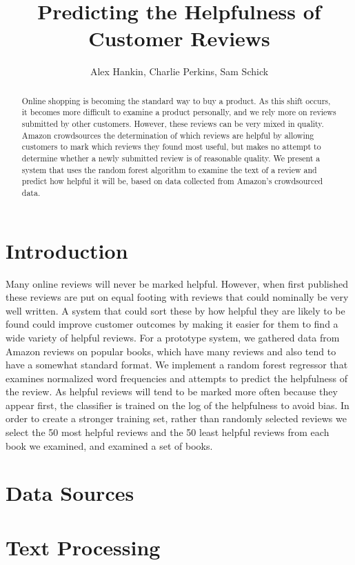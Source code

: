 \documentclass[twocolumn]{article}
\title{Predicting the Helpfulness of Customer Reviews}
\author{Alex Hankin, Charlie Perkins, Sam Schick}
\date{}
\begin{document}
\maketitle

\begin{abstract}
	Online shopping is becoming the standard way to buy a product. As this shift occurs, it becomes more difficult to examine a product personally, and we rely more on reviews submitted by other customers. However, these reviews can be very mixed in quality. Amazon crowdsources the determination of which reviews are helpful by allowing customers to mark which reviews they found most useful, but makes no attempt to determine whether a newly submitted review is of reasonable quality. We present a system that uses the random forest algorithm to examine the text of a review and predict how helpful it will be, based on data collected from Amazon's crowdsourced data.
\end{abstract}

\section{Introduction}
	Many online reviews will never be marked helpful. However, when first published these reviews are put on equal footing with reviews that could nominally be very well written. A system that could sort these by how helpful they are likely to be found could improve customer outcomes by making it easier for them to find a wide variety of helpful reviews. For a prototype system, we gathered data from Amazon reviews on popular books, which have many reviews and also tend to have a somewhat standard format. We implement a random forest regressor that examines normalized word frequencies and attempts to predict the helpfulness of the review. As helpful reviews will tend to be marked more often because they appear first, the classifier is trained on the log of the helpfulness to avoid bias. In order to create a stronger training set, rather than randomly selected reviews we select the 50 most helpful reviews and the 50 least helpful reviews from each book we examined, and examined a set of %
	books.

\section{Data Sources}

\section{Text Processing}
\end{document}
